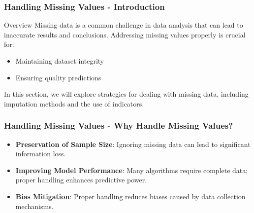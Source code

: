 \documentclass[aspectratio=169]{beamer}
\begin{document}
\begin{frame}[fragile]
    \frametitle{Handling Missing Values - Introduction}
    \begin{block}{Overview}
        Missing data is a common challenge in data analysis that can lead to inaccurate results and conclusions. Addressing missing values properly is crucial for:
    \end{block}
    \begin{itemize}
        \item Maintaining dataset integrity
        \item Ensuring quality predictions
    \end{itemize}
    In this section, we will explore strategies for dealing with missing data, including imputation methods and the use of indicators.
\end{frame}

\begin{frame}[fragile]
    \frametitle{Handling Missing Values - Why Handle Missing Values?}
    \begin{itemize}
        \item \textbf{Preservation of Sample Size}: Ignoring missing data can lead to significant information loss.
        \item \textbf{Improving Model Performance}: Many algorithms require complete data; proper handling enhances predictive power.
        \item \textbf{Bias Mitigation}: Proper handling reduces biases caused by data collection mechanisms.
    \end{itemize}
\end{frame}
\end{document}
